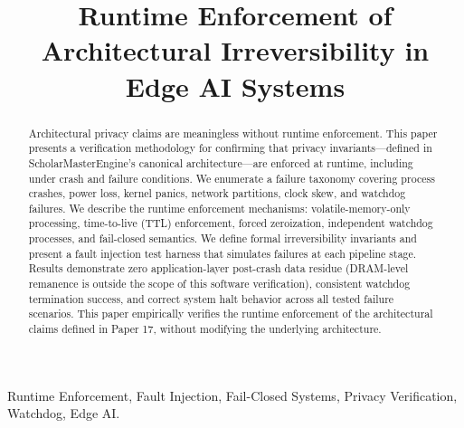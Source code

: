 \documentclass[conference]{IEEEtran}
\begin{document}
\title{Runtime Enforcement of Architectural Irreversibility in Edge AI Systems}

\author{
}

\maketitle

\begin{abstract}
Architectural privacy claims are meaningless without runtime enforcement. This paper presents a verification methodology for confirming that privacy invariants---defined in ScholarMasterEngine's canonical architecture---are enforced at runtime, including under crash and failure conditions. We enumerate a failure taxonomy covering process crashes, power loss, kernel panics, network partitions, clock skew, and watchdog failures. We describe the runtime enforcement mechanisms: volatile-memory-only processing, time-to-live (TTL) enforcement, forced zeroization, independent watchdog processes, and fail-closed semantics. We define formal irreversibility invariants and present a fault injection test harness that simulates failures at each pipeline stage. Results demonstrate zero application-layer post-crash data residue (DRAM-level remanence is outside the scope of this software verification), consistent watchdog termination success, and correct system halt behavior across all tested failure scenarios. This paper empirically verifies the runtime enforcement of the architectural claims defined in Paper 17, without modifying the underlying architecture.
\end{abstract}

\begin{IEEEkeywords}
Runtime Enforcement, Fault Injection, Fail-Closed Systems, Privacy Verification, Watchdog, Edge AI.
\end{IEEEkeywords}

\end{document}

